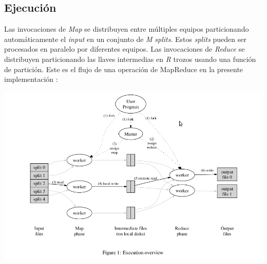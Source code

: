 \documentclass[spanish]{article}
\begin{document}
\subsection{Ejecuci\'{o}n}
	Las invocaciones de \textit{Map} se distribuyen entre múltiples equipos particionando automáticamente el \textit{input} en un conjunto de \textit{M} \textit{splits}. Estos \textit{splits} pueden ser procesados en paralelo por diferentes equipos. Las invocaciones de \textit{Reduce} se distribuyen particionando las llaves intermedias en \textit{R} trozos usando una función de partición. Este es el flujo de una operación de MapReduce en la presente implementación \cite{MapReduceGoogle}: 
\begin{center}\includegraphics[width=13.5cm]{imagenes/ExecutionOverview.png}\end{center}
\end{document}
